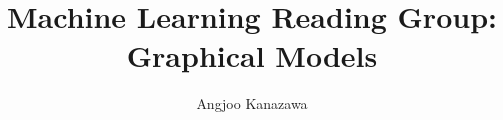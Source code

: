 \newcommand{\sig}{\sigma}
\newcommand{\eps}{\epsilon}
\newcommand{\del}{\delta}
\newcommand{\ah}{\alpha}
\newcommand{\lam}{\lambda}
\newcommand{\gam}{\gamma}
\newcommand{\kap}{\kappa}
\newcommand{\rarr}{\rightarrow}
\newcommand{\larr}{\leftarrow}
\newcommand{\ol}{\overline}
\newcommand{\mbb}{\mathbb}
\newcommand{\contra}{\Rightarrow\Leftarrow}
\newcommand{\lc}{\langle} %
\newcommand{\rc}{\rangle} %

\newcommand{\ben}{\begin{enumerate}}
\newcommand{\een}{\end{enumerate}}
\newcommand{\beq}{\begin{quote}}
\newcommand{\enq}{\end{quote}}
\newcommand{\hsone}{\hspace*{1cm}}
\newcommand{\hstwo}{\hspace*{2cm}}

\newcommand{\noi}{\noindent}
\parskip 5pt
\parindent 0pt

\documentclass[a4paper]{article}
\usepackage{amsmath,amssymb,algorithmic}

\title{Machine Learning Reading Group: Graphical Models}
\author{Angjoo Kanazawa}
\maketitle
